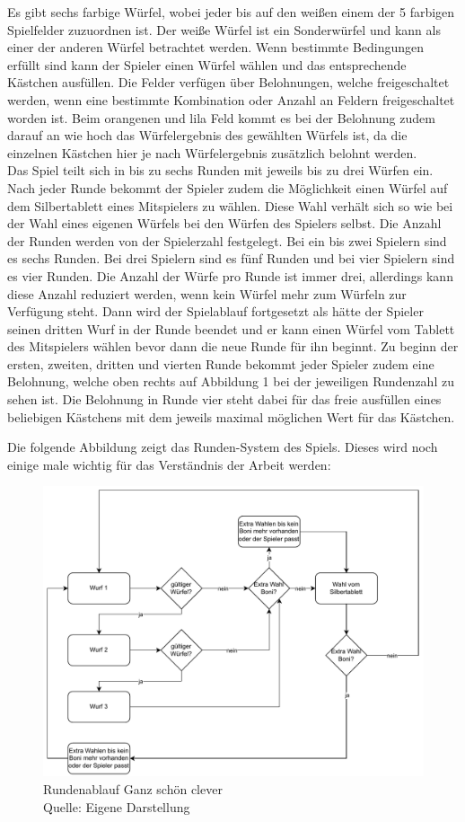 Es gibt sechs farbige Würfel, wobei jeder bis auf den weißen einem der 5 farbigen Spielfelder zuzuordnen ist. Der weiße Würfel ist ein Sonderwürfel und kann als einer der anderen Würfel betrachtet werden. Wenn bestimmte Bedingungen erfüllt sind kann der Spieler einen Würfel wählen und das entsprechende Kästchen ausfüllen. Die Felder verfügen über Belohnungen, welche freigeschaltet werden, wenn eine bestimmte Kombination oder Anzahl an Feldern freigeschaltet worden ist. Beim orangenen und lila Feld kommt es bei der Belohnung zudem darauf an wie hoch das Würfelergebnis des gewählten Würfels ist, da die einzelnen Kästchen hier je nach Würfelergebnis zusätzlich belohnt werden.
\\
Das Spiel teilt sich in bis zu sechs Runden mit jeweils bis zu drei Würfen ein. Nach jeder Runde bekommt der Spieler zudem die Möglichkeit einen Würfel auf dem Silbertablett eines Mitspielers zu wählen. Diese Wahl verhält sich so wie bei der Wahl eines eigenen Würfels bei den Würfen des Spielers selbst. Die Anzahl der Runden werden von der Spielerzahl festgelegt. Bei ein bis zwei Spielern sind es sechs Runden. Bei drei Spielern sind es fünf Runden und bei vier Spielern sind es vier Runden. Die Anzahl der Würfe pro Runde ist immer drei, allerdings kann diese Anzahl reduziert werden, wenn kein Würfel mehr zum Würfeln zur Verfügung steht. Dann wird der Spielablauf fortgesetzt als hätte der Spieler seinen dritten Wurf in der Runde beendet und er kann einen Würfel vom Tablett des Mitspielers wählen bevor dann die neue Runde für ihn beginnt. Zu beginn der ersten, zweiten, dritten und vierten Runde bekommt jeder Spieler zudem eine Belohnung, welche oben rechts auf Abbildung 1 bei der jeweiligen Rundenzahl zu sehen ist. Die Belohnung in Runde vier steht dabei für das freie ausfüllen eines beliebigen Kästchens mit dem jeweils maximal möglichen Wert für das Kästchen.

	Die folgende Abbildung zeigt das Runden-System des Spiels. Dieses wird noch einige male wichtig für das Verständnis der Arbeit werden:
	\nopagebreak
\begin{figure}[h]
	\includegraphics[width=1\textwidth]{Bilder/Rundenablauf.drawio} 
	\caption[Rundenablauf Ganz schön clever]{Rundenablauf Ganz schön clever\\ Quelle: Eigene Darstellung}
\end{figure}

